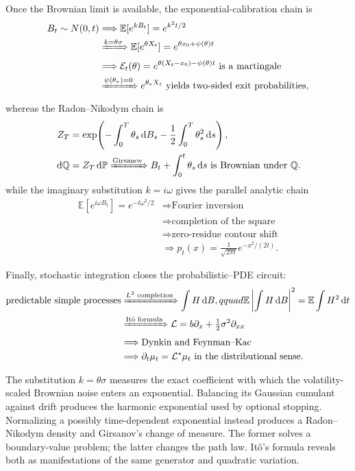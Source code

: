 \documentclass[10pt,a4paper]{article}
\numberwithin{equation}{section}
\theoremstyle{blueplain}
\theoremstyle{definition}
\newcommand{\E}{\mathbb E}
\newcommand{\Pp}{\mathbb P}
\newcommand{\dd}{\,\mathrm d}
\begin{document}
Once the Brownian limit is available, the exponential-calibration chain is
\begin{align*}
 B_t\sim N(0,t)
 &\Longrightarrow
 \E[e^{kB_t}]=e^{k^2t/2}\\
 &\xRightarrow{k=\theta\sigma}
 \E[e^{\theta X_t}]
 =e^{\theta x_0+\psi(\theta)t}\\
 &\Longrightarrow
 \mathcal E_t(\theta)
 =e^{\theta(X_t-x_0)-\psi(\theta)t}
 \text{ is a martingale}\\
 &\xRightarrow{\psi(\theta_*)=0}
 e^{\theta_*X_t}
 \text{ yields two-sided exit probabilities},
\end{align*}
whereas the Radon--Nikodym chain is
\begin{align*}
 Z_T
 &=\exp\!\left(-\int_0^T\theta_s\dd B_s
               -\frac12\int_0^T\theta_s^2\dd s\right),\\
 \dd\mathbb Q&=Z_T\dd\Pp
 \xRightarrow{\text{Girsanov}}
 B_t+\int_0^t\theta_s\dd s
 \text{ is Brownian under }\mathbb Q.
\end{align*}
while the imaginary substitution \(k=i\omega\) gives the parallel analytic
chain
\begin{align*}
 \E[e^{i\omega B_t}]=e^{-t\omega^2/2}
 &\Longrightarrow \text{Fourier inversion}\\
 &\Longrightarrow \text{completion of the square}\\
 &\Longrightarrow \text{zero-residue contour shift}\\
 &\Longrightarrow
 p_t(x)=\frac1{\sqrt{2\pi t}}e^{-x^2/(2t)}.
\end{align*}

Finally, stochastic integration closes the probabilistic--PDE circuit:
\begin{align*}
 \text{predictable simple processes}
 &\xRightarrow{L^2\text{ completion}}
 \int H\dd B,qquad
 \E\left|\int H\dd B\right|^2=\E\int H^2\dd t\\
 &\xRightarrow{\text{It\^o formula}}
 \mathcal L=b\partial_x+\tfrac12\sigma^2\partial_{xx}\\
 &\Longrightarrow \text{Dynkin and Feynman--Kac}\\
 &\Longrightarrow
 \partial_t\mu_t=\mathcal L^*\mu_t
 \text{ in the distributional sense}.
\end{align*}

\begin{keybox}
The substitution \(k=\theta\sigma\) measures the exact coefficient with which
the volatility-scaled Brownian noise enters an exponential.  Balancing its
Gaussian cumulant against drift produces the harmonic exponential used by
optional stopping.  Normalizing a possibly time-dependent exponential instead
produces a Radon--Nikodym density and Girsanov's change of measure.  The former
solves a boundary-value problem; the latter changes the path law.  It\^o's
formula reveals both as manifestations of the same generator and quadratic
variation.
\end{keybox}
\endgroup
\end{document}
